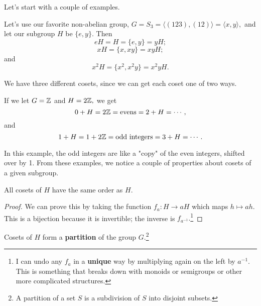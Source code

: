 Let's start with a couple of examples. 

\begin{example}[Cosets in $S_3$]
Let's use our favorite non-abelian group, $G = S_3 = \langle (123), (12) \rangle = \langle x, y \rangle,$ and let our subgroup $H$ be $\{e, y\}.$ Then 
\[
eH = H = \{e, y\} = yH;
\]
\[
xH = \{x, xy\} = xyH;
\]
and
\[
x^2H = \{x^2, x^2y\} = x^2yH.
\]

We have three different cosets, since we can get each coset one of two ways.
\end{example}

\begin{example}
If we let $G = \mathbb Z$ and $H = 2\mathbb Z,$ we get 
\[
0 + H = 2\mathbb Z = \text{evens} = 2 + H = \cdots,
\]
and 
\[
1 + H = 1 + 2\mathbb Z = \text{odd integers} = 3 + H = \cdots .
\]
\end{example}

In this example, the odd integers are like a "copy" of the even integers, shifted over by 1. From these examples, we notice a couple of properties about cosets of a given subgroup.

\begin{proposition}
All cosets of $H$ have the same order as $H.$%
\end{proposition}
\begin{proof}
We can prove this by taking the function $f_a: H \rightarrow aH$ which maps $h \mapsto ah.$ This is a bijection because it is invertible; the inverse is $f_{a^{-1}}.$\footnote{I can undo any $f_a$ in a \textbf{unique} way by multiplying again on the left by $a^{-1}$. This is something that breaks down with monoids or semigroups or other more complicated structures.}
\end{proof}

\begin{proposition}
Cosets of $H$ form a \textbf{partition} of the group $G$.\footnote{A partition of a set $S$ is a subdivision of $S$ into disjoint subsets.}
\end{proposition}


